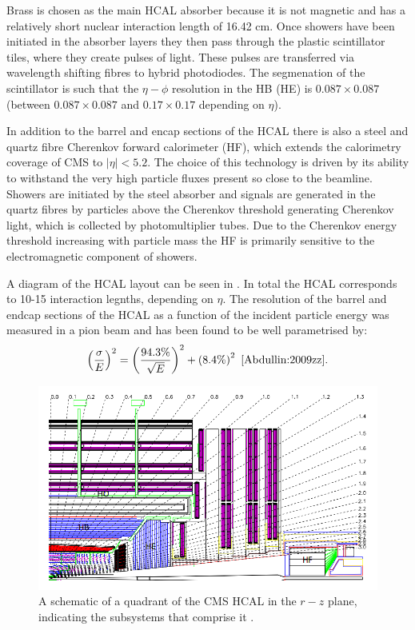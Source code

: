 Brass is chosen as the main \ac{HCAL} absorber because it is not magnetic and has a relatively short nuclear interaction length of 16.42 cm. Once showers have been initiated in the absorber layers they then pass through the plastic scintillator tiles, where they create pulses of light. These pulses are transferred via wavelength shifting fibres to hybrid photodiodes. The segmenation of the scintillator is such that the $\eta-\phi$ resolution in the \ac{HB} (\ac{HE}) is $0.087\times 0.087$ (between $0.087\times 0.087$ and $0.17\times 0.17$ depending on $\eta$).

In addition to the barrel and encap sections of the \ac{HCAL} there is also a steel and quartz fibre Cherenkov forward calorimeter (\ac{HF}), which extends the calorimetry coverage of CMS to $|\eta|<5.2$. The choice of this technology is driven by its ability to withstand the very high particle fluxes present so close to the beamline. Showers are initiated by the steel absorber and signals are generated in the quartz fibres by particles above the Cherenkov threshold generating Cherenkov light, which is collected by photomultiplier tubes. Due to the Cherenkov energy threshold increasing with particle mass the \ac{HF} is primarily sensitive to the electromagnetic component of showers.

A diagram of the \ac{HCAL} layout can be seen in . In total the \ac{HCAL} corresponds to 10-15 interaction legnths, depending on $\eta$. The resolution of the barrel and endcap sections of the \ac{HCAL} as a function of the incident particle energy was measured in a pion beam and has been found to be well parametrised by:
\begin{equation} 
  \label{eq:hcalres}
  \left(\frac{\sigma}{E}\right)^{2}=\left(\frac{94.3\%}{\sqrt{E}}\right)^{2}+\left(8.4\%\right)^{2}~\cite{Abdullin:2009zz}.
\end{equation}

\begin{figure}
  \includegraphics[width=1.2\largefigwidth]{plots/detector/hcal_layout1.png}
  \caption{A schematic of a quadrant of the CMS \ac{HCAL} in the $r-z$ plane, indicating the subsystems that comprise it \cite{Chatrchyan:2008aa}.}
  \label{fig:hcalschematic}
\end{figure}

